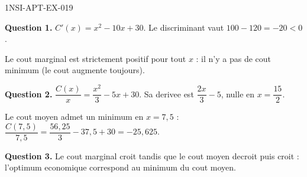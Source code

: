 \begin{corrige}{1NSI-APT-EX-019}

\textbf{Question 1.} $C'(x) = x^2 - 10x + 30$. Le discriminant vaut $100 - 120 = -20 < 0$.


Le cout marginal est strictement positif pour tout $x$ : il n'y a pas de cout minimum (le cout augmente toujours).

\textbf{Question 2.} $\dfrac{C(x)}{x} = \dfrac{x^2}{3} - 5x + 30$. Sa derivee est $\dfrac{2x}{3} - 5$, nulle en $x = \dfrac{15}{2}$.

Le cout moyen admet un minimum en $x = 7{,}5$ : $\dfrac{C(7{,}5)}{7{,}5} = \dfrac{56{,}25}{3} - 37{,}5 + 30 = -25{,}625$.

\textbf{Question 3.} Le cout marginal croit tandis que le cout moyen decroit puis croit : l'optimum economique correspond au minimum du cout moyen.

\end{corrige}

